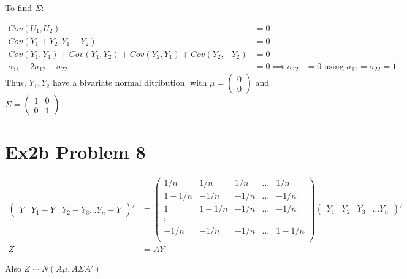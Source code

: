 \documentclass[a4paper]{article}
\begin{document}
To find $\Sigma$:

\begin{align*}
Cov(U_1,U_2) &= 0\\
Cov(Y_1+Y_2, Y_1-Y_2) &=0\\
Cov(Y_1,Y_1)+Cov(Y_1, Y_2)+Cov(Y_2,Y_1)+Cov(Y_2, -Y_2) &= 0\\
\sigma_{11}+2\sigma_{12}-\sigma_{22} &=0
\implies \sigma_{12} &=0 \text{ using } \sigma_{11} = \sigma_{22} =1
\end{align*}
Thus, $Y_1,Y_2$ have a bivariate normal ditribution. with $\mu= \begin{pmatrix}
0\\
0
\end{pmatrix}$ and $\Sigma = \begin{pmatrix}
1 & 0\\
0 & 1
\end{pmatrix}$


\section*{Ex2b Problem 8}

\begin{align*}
\begin{pmatrix} \bar{Y} & Y_1-\bar{Y}& Y_2-\bar{Y_3} \dots Y_n-\bar{Y}\end{pmatrix}' &= \begin{pmatrix}
1/n & 1/n & 1/n & \dots & 1/n\\
1-1/n & -1/n & -1/n & \dots & -1/n\\
1 & 1-1/n & -1/n & \dots & -1/n\\
\vdots \\
-1/n & -1/n & -1/n & \dots & 1-1/n\\
\end{pmatrix} \begin{pmatrix} Y_1 & Y_2 & Y_3 &\dots Y_n \end{pmatrix}'\\
Z &= AY
\end{align*}

Also $Z \sim N(A\mu, A\Sigma A')$
\end{document}
